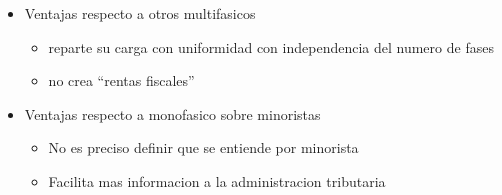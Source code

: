 \documentclass[
  letterpaper,
  DIV=11,
  numbers=noendperiod]{scrartcl}
\begin{document}
\begin{itemize}
\item
  Ventajas respecto a otros multifasicos

  \begin{itemize}
  \item
    reparte su carga con uniformidad con independencia del numero de
    fases
  \item
    no crea ``rentas fiscales''
  \end{itemize}
\item
  Ventajas respecto a monofasico sobre minoristas

  \begin{itemize}
  \item
    No es preciso definir que se entiende por minorista
  \item
    Facilita mas informacion a la administracion tributaria
  \end{itemize}
\end{itemize}
\end{document}
